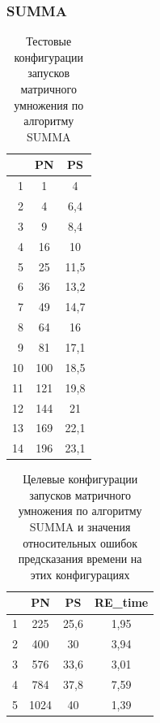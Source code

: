 		\subsubsection{SUMMA}
			\begin{table}[h]
				\centering
				\begin{tabular}{|r|c|c|}
					\hline
					\textnumero & PN  & PS                     \\ \hline
					1           & 1   & 4                      \\ \hline
					2           & 4   & 6,4                    \\ \hline
					3           & 9   & 8,4                    \\ \hline
					4           & 16  & 10                     \\ \hline
					5           & 25  & 11,5                   \\ \hline
					6           & 36  & 13,2                   \\ \hline
					7           & 49  & 14,7                   \\ \hline
					8           & 64  & 16                     \\ \hline
					9           & 81  & 17,1                   \\ \hline
					10          & 100 & 18,5                   \\ \hline
					11          & 121 & 19,8                   \\ \hline
					12          & 144 & 21                     \\ \hline
					13          & 169 & 22,1                   \\ \hline
					14          & 196 & 23,1                   \\ \hline
				\end{tabular}
				\caption{Тестовые конфигурации запусков матричного умножения по алгоритму SUMMA}
				\label{test_SUMMA}
			\end{table}
			\begin{table}
				\centering
				\begin{tabular}{|r|c|c|c|}
				\hline
				\textnumero & PN   & PS   & RE\_time        \\ \hline
				1           & 225  & 25,6 & 1,95            \\ \hline
				2           & 400  & 30   & 3,94            \\ \hline
				3           & 576  & 33,6 & 3,01            \\ \hline
				4           & 784  & 37,8 & 7,59            \\ \hline
				5           & 1024 & 40   & 1,39            \\ \hline
				\end{tabular}
				\caption{Целевые конфигурации запусков матричного умножения по алгоритму SUMMA и значения относительных ошибок предсказания времени на этих конфигурациях}
				\label{target_SUMMA}
			\end{table}
